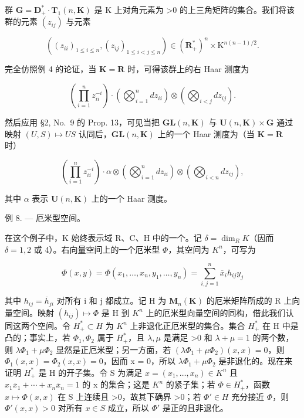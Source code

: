 群 \(\mathbf{G} = \mathbf{D}_{+}^{*} \cdot \mathbf{T}_{1}(n, \mathbf{K})\) 是 K 上对角元素为 \textgreater0 的上三角矩阵的集合。我们将该群的元素 \((z_{ij})\) 与元素

\[
\left(\left(z _ {i i}\right) _ {1 \leqslant i \leqslant n}, \left(z _ {i j}\right) _ {1 \leqslant i <   j \leqslant n}\right) \in \left(\mathbf {R} _ {+} ^ {*}\right) ^ {n} \times \mathrm{K} ^ {n (n - 1) / 2}.
\]

完全仿照例 4 的论证，当 \(\mathbf{K} = \mathbf{R}\) 时，可得该群上的右 Haar 测度为

\[
\left(\prod_ {i = 1} ^ {n} z _ {i i} ^ {- i}\right) \cdot \left(\bigotimes_ {i = 1} ^ {n} d z _ {i i}\right) \otimes \left(\bigotimes_ {i <   j} d z _ {i j}\right).
\]

然后应用 §2, No.~9 的 Prop. 13，可见当把 \(\mathbf{GL}(n,\mathbf{K})\) 与 \(\mathbf{U}(n,\mathbf{K})\times\mathbf{G}\) 通过映射 \((U,S)\mapsto US\) 认同后，\(\mathbf{GL}(n,\mathbf{K})\) 上的一个 Haar 测度为（当 \(\mathbf{K}=\mathbf{R}\) 时）

\[
\left(\prod_ {i = 1} ^ {n} z _ {i i} ^ {- i}\right) \cdot \alpha \otimes \left(\bigotimes_ {i = 1} ^ {n} d z _ {i i}\right) \otimes \left(\bigotimes_ {i <   n} d z _ {i j}\right),\tag{14}
\]

其中 \(\alpha\) 表示 \(\mathbf{U}(n,\mathbf{K})\) 上的一个 Haar 测度。

例 8. --- 厄米型空间。

在这个例子中，K 始终表示域 R、C、H 中的一个。记 \(\delta = \dim_{R} K\)（因而 \(\delta = 1, 2\) 或 4）。右向量空间上的一个厄米型 \(\Phi\)，其空间为 \(K^{n}\)，可写为

\[
\Phi (x, y) = \Phi (x _ {1}, \dots , x _ {n}, y _ {1}, \dots , y _ {n}) = \sum_ {i, j = 1} ^ {n} \overline {{{{x}}}} _ {i} h _ {i j} y _ {j}
\]

其中 \(h_{ij} = \overline{h}_{ji}\) 对所有 i 和 j 都成立。记 H 为 \(\mathbf{M}_{n}(\mathbf{K})\) 的厄米矩阵所成的 R 上向量空间。映射 \((h_{ij}) \mapsto \Phi\) 是 H 到 \(K^{n}\) 上的厄米型向量空间的同构，借此我们认同这两个空间。令 \(H_{+}^{*} \subset H\) 为 \(K^{n}\) 上非退化正厄米型的集合。集合 \(H_{+}^{*}\) 在 H 中是凸的；事实上，若 \(\Phi_{1}, \Phi_{2}\) 属于 \(H_{+}^{*}\)，且 \(\lambda, \mu\) 是满足 \textgreater0 和 \(\lambda + \mu = 1\) 的两个数，则 \(\lambda \Phi_{1} + \mu \Phi_{2}\) 显然是正厄米型；另一方面，若 \((\lambda \Phi_{1} + \mu \Phi_{2})(x, x) = 0\)，则 \(\Phi_{1}(x, x) = \Phi_{2}(x, x) = 0\)，因而 x = 0，所以 \(\lambda \Phi_{1} + \mu \Phi_{2}\) 是非退化的。现在来证明 \(H_{+}^{*}\) 是 H 的开子集。令 S 为满足 \(x = (x_{1}, \ldots, x_{n}) \in K^{n}\) 且 \(x_{1} \overline{x}_{1} + \cdots + x_{n} \overline{x}_{n} = 1\) 的 x 的集合；这是 \(K^{n}\) 的紧子集；若 \(\Phi \in H_{+}^{*}\)，函数 \(x \mapsto \Phi(x, x)\) 在 S 上连续且 \textgreater0，故其下确界 \textgreater0；若 \(\Phi' \in H\) 充分接近 \(\Phi\)，则 \(\Phi'(x, x) > 0\) 对所有 \(x \in S\) 成立，所以 \(\Phi'\) 是正的且非退化。

